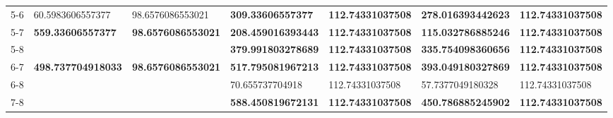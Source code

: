 \begin{table}[ht]
\begin{tabular}{rllllll}
  5-6 & 60.5983606557377 & 98.6576086553021 & \textbf{309.33606557377} & \textbf{112.74331037508} & \textbf{278.016393442623} & \textbf{112.74331037508} \\ 
  5-7 & \textbf{559.33606557377} & \textbf{98.6576086553021} & \textbf{208.459016393443} & \textbf{112.74331037508} & \textbf{115.032786885246} & \textbf{112.74331037508} \\ 
  5-8 &  &  & \textbf{379.991803278689} & \textbf{112.74331037508} & \textbf{335.754098360656} & \textbf{112.74331037508} \\ 
  6-7 & \textbf{498.737704918033} & \textbf{98.6576086553021} & \textbf{517.795081967213} & \textbf{112.74331037508} & \textbf{393.049180327869} & \textbf{112.74331037508} \\ 
  6-8 &  &  & 70.655737704918 & 112.74331037508 & 57.7377049180328 & 112.74331037508 \\ 
  7-8 &  &  & \textbf{588.450819672131} & \textbf{112.74331037508} & \textbf{450.786885245902} & \textbf{112.74331037508} \\ 
   \bottomrule
\end{tabular}
\end{table}
